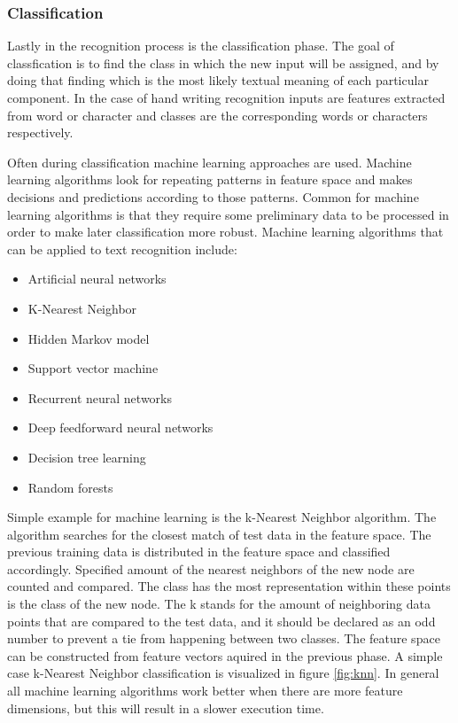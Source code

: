 \documentclass{article}
\begin{document}
      \subsubsection{Classification}
        Lastly in the recognition process is the classification phase. The goal of classfication is to find the class in which the new input will be assigned, and by doing that finding which is the most likely textual meaning of each particular component. In the case of hand writing recognition inputs are features extracted from word or character and classes are the corresponding words or characters respectively.

        Often during classification machine learning approaches are used. Machine learning algorithms look for repeating patterns in feature space and makes decisions and predictions according to those patterns. Common for machine learning algorithms is that they require some preliminary data to be processed in order to make later classification more robust. Machine learning algorithms that can be applied to text recognition include:
        \begin{itemize}
          \item Artificial neural networks
          \item K-Nearest Neighbor
          \item Hidden Markov model
          \item Support vector machine
          \item Recurrent neural networks
          \item Deep feedforward neural networks
          \item Decision tree learning
          \item Random forests
        \end{itemize}
          Simple example for machine learning is the k-Nearest Neighbor algorithm. The algorithm searches for the closest match of test data in the feature space. The previous training data is distributed in the feature space and classified accordingly. Specified amount of the nearest neighbors of the new node are counted and compared. The class has the most representation within these points is the class of the new node. The k stands for the amount of neighboring data points that are compared to the test data, and it should be declared as an odd number to prevent a tie from happening between two classes. The feature space can be constructed from feature vectors aquired in the previous phase. A simple case k-Nearest Neighbor classification is visualized in figure \ref{fig:knn}. In general all machine learning algorithms work better when there are more feature dimensions, but this will result in a slower execution time.\cite{Beyer}
\end{document}

